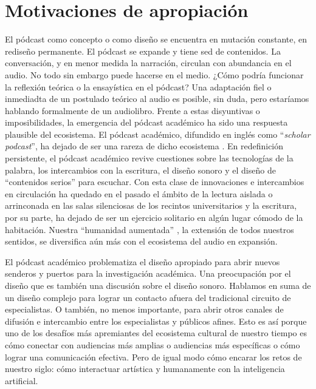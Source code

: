 \documentclass[
  spanish,
  11pt,
  a4paper,
]{scrbook}
\begin{document}
\section*{Motivaciones de
apropiación}\label{motivaciones-de-apropiaciuxf3n}


El pódcast como concepto o como diseño se encuentra en mutación
constante, en rediseño permanente. El pódcast se expande y tiene sed de
contenidos. La conversación, y en menor medida la narración, circulan
con abundancia en el audio. No todo sin embargo puede hacerse en el
medio. ¿Cómo podría funcionar la reflexión teórica o la ensayística en
el pódcast? Una adaptación fiel o inmediadta de un postulado teórico al
audio es posible, sin duda, pero estaríamos hablando formalmente de un
audiolibro. Frente a estas disyuntivas o imposibilidades, la emergencia
del pódcast académico ha sido una respuesta plausible del ecosistema. El
pódcast académico, difundido en inglés como ``\emph{scholar podcast}'',
ha dejado de ser una rareza de dicho ecosistema
\autocite{BeltranNieves2023}. En redefinición persistente, el pódcast
académico revive cuestiones sobre las tecnologías de la palabra, los
intercambios con la escritura, el diseño sonoro y el diseño de
``contenidos serios'' para escuchar. Con esta clase de innovaciones e
intercambios en circulación ha quedado en el pasado el ámbito de la
lectura aislada o arrinconada en las salas silenciosas de los recintos
universitarios y la escritura, por su parte, ha dejado de ser un
ejercicio solitario en algún lugar cómodo de la habitación. Nuestra
``humanidad aumentada'' \autocite{Baricco2019}, la extensión de todos
nuestros sentidos, se diversifica aún más con el ecosistema del audio en
expansión.

El pódcast académico problematiza el diseño apropiado para abrir nuevos
senderos y puertos para la investigación académica. Una preocupación por
el diseño que es también una discusión sobre el diseño sonoro. Hablamos
en suma de un diseño complejo para lograr un contacto afuera del
tradicional circuito de especialistas. O también, no menos importante,
para abrir otros canales de difusión e intercambio entre los
especialistas y públicos afines. Esto es así porque uno de los desafíos
más apremiantes del ecosistema cultural de nuestro tiempo es cómo
conectar con audiencias más amplias o audiencias más específicas o cómo
lograr una comunicación efectiva. Pero de igual modo cómo encarar los
retos de nuestro siglo: cómo interactuar artística y humanamente con la
inteligencia artificial.
\end{document}
